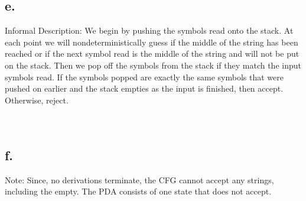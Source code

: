 \documentclass{scrartcl}
\begin{document}
\subsection*{e.}
Informal Description: We begin by pushing the symbols read onto the stack. At each
point we will nondeterministically guess if the middle of the string has been reached or if the next symbol read is the middle of the string and will not be put on the stack. Then we pop off the symbols from the stack if they match the input symbols read. If the symbols popped are exactly the same symbols that were pushed on earlier and the stack empties as the input is finished, then accept. Otherwise, reject.
\\
\\
\\

\subsection*{f.}
Note: Since, no derivations terminate, the CFG cannot accept any strings, including the empty. The PDA consists of one state that does not accept.
\\
\\
\\
\end{document}
